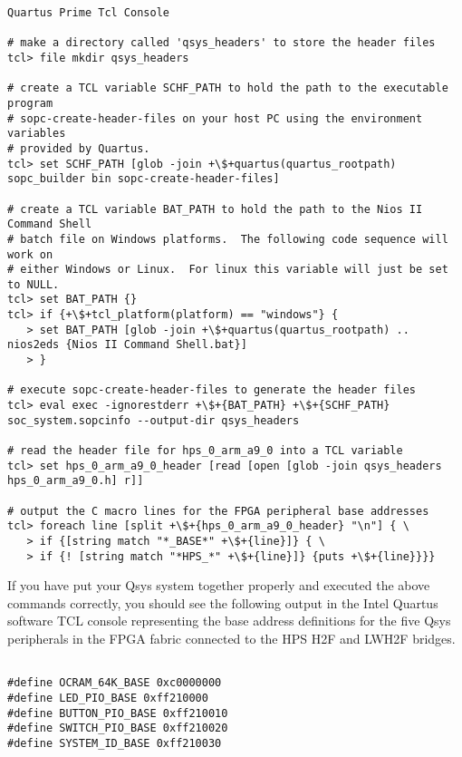 \begin{flushleft}
\begin{enumerate}[
	label=\textbf{Step \arabic*.},
	leftmargin=*,
	widest={00},
	align=left]
\begin{verbatim}
Quartus Prime Tcl Console

# make a directory called 'qsys_headers' to store the header files
tcl> file mkdir qsys_headers

# create a TCL variable SCHF_PATH to hold the path to the executable program
# sopc-create-header-files on your host PC using the environment variables
# provided by Quartus.
tcl> set SCHF_PATH [glob -join +\$+quartus(quartus_rootpath) sopc_builder bin sopc-create-header-files]

# create a TCL variable BAT_PATH to hold the path to the Nios II Command Shell
# batch file on Windows platforms.  The following code sequence will work on
# either Windows or Linux.  For linux this variable will just be set to NULL.
tcl> set BAT_PATH {}
tcl> if {+\$+tcl_platform(platform) == "windows"} {
   > set BAT_PATH [glob -join +\$+quartus(quartus_rootpath) .. nios2eds {Nios II Command Shell.bat}]
   > }

# execute sopc-create-header-files to generate the header files
tcl> eval exec -ignorestderr +\$+{BAT_PATH} +\$+{SCHF_PATH} soc_system.sopcinfo --output-dir qsys_headers

# read the header file for hps_0_arm_a9_0 into a TCL variable
tcl> set hps_0_arm_a9_0_header [read [open [glob -join qsys_headers hps_0_arm_a9_0.h] r]]

# output the C macro lines for the FPGA peripheral base addresses
tcl> foreach line [split +\$+{hps_0_arm_a9_0_header} "\n"] { \
   > if {[string match "*_BASE*" +\$+{line}]} { \
   > if {! [string match "*HPS_*" +\$+{line}]} {puts +\$+{line}}}}

\end{verbatim}

If you have put your Qsys system together properly and executed the above commands correctly, you should see the following output in the Intel Quartus software TCL console representing the base address definitions for the five Qsys peripherals in the FPGA fabric connected to the HPS H2F and LWH2F bridges.

\begin{verbatim}

#define OCRAM_64K_BASE 0xc0000000
#define LED_PIO_BASE 0xff210000
#define BUTTON_PIO_BASE 0xff210010
#define SWITCH_PIO_BASE 0xff210020
#define SYSTEM_ID_BASE 0xff210030

\end{verbatim}

\end{enumerate}


\end{flushleft}
